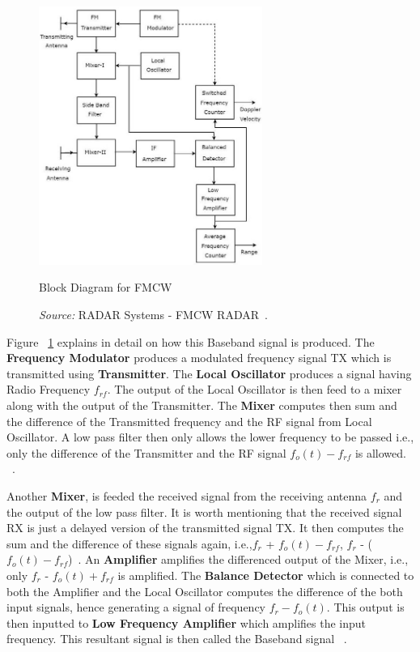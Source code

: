  \begin{figure}[ht]
  \begin{center}
    \includegraphics[width=0.650\textwidth]{Master's thesis/images/fmcw_working.jpg} 
    \caption{Block Diagram for FMCW}
    \caption*{\textit{Source:} RADAR Systems - FMCW RADAR~\cite{tutorialspoint}.}
    \label{fig:fmcw}
  \end{center}
\end{figure}   

Figure ~\ref{fig:fmcw} explains in detail on how this Baseband signal is produced. 
The \textbf{Frequency Modulator} produces a modulated frequency signal TX which is transmitted using \textbf{Transmitter}. The \textbf{Local Oscillator} produces a signal having Radio Frequency \(f_{rf}\). The output of the Local Oscillator is then feed to a mixer along with the output of the Transmitter. The \textbf{Mixer} computes then sum and the difference of the Transmitted frequency and the RF signal from Local Oscillator. A low pass filter then only allows the lower frequency to be passed i.e., only the difference of the Transmitter and the RF signal \(f_o(t) - f_{rf}\) is allowed. ~\cite{tutorialspoint}. 

Another \textbf{Mixer}, is feeded the received signal from the receiving antenna \(f_r\) and the output of the low pass filter. It is worth mentioning that the received signal RX is just a delayed version of the transmitted signal TX. It then computes the sum and the difference of these signals again, i.e.,\(f_r\) + \(f_o(t) - f_{rf}\), \(f_r\) - (\(f_o(t) - f_{rf}\))~\cite{tutorialspoint}. An \textbf{Amplifier} amplifies the differenced output of the Mixer, i.e., only \(f_r\) - \(f_o(t) + f_{rf}\) is amplified. The \textbf{Balance Detector} which is connected to both the Amplifier and the Local Oscillator computes the difference of the both input signals, hence generating a signal of frequency \(f_r - f_o(t)\). 
This output is then inputted to \textbf{Low Frequency Amplifier} which amplifies the input frequency. This resultant signal is then called the Baseband signal ~\cite{tutorialspoint}. 


